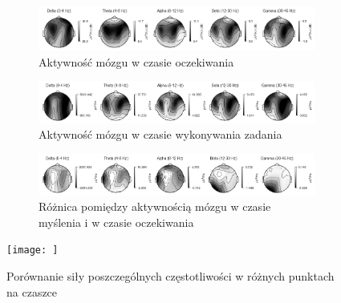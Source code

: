 \documentclass{./assets/wfis}
\begin{document}
\begin{figure}[h!]
    \centering
    \begin{subfigure}[b]{\textwidth}
    \centering
    \includegraphics[width=\columnwidth]{thesis/assets/waiting.png}
    \caption{Aktywność mózgu w czasie oczekiwania}
    \label{fig:waiting}
\end{subfigure}


\begin{subfigure}[b]{\textwidth}
    \centering
    \includegraphics[width=\columnwidth]{thesis/assets/thinking.png}
    \caption{Aktywność mózgu w czasie wykonywania zadania}
    \label{fig:thinking}
\end{subfigure}


\begin{subfigure}[b]{\textwidth}
    \centering
    \includegraphics[width=\columnwidth]{thesis/assets/diff.png}
    \caption{Różnica pomiędzy aktywnością mózgu w czasie myślenia i w czasie oczekiwania}
    \label{fig:diff}
\end{subfigure}
    \texttt{[image: ]}
    \caption{Porównanie siły poszczególnych częstotliwości w różnych punktach na czaszce}
    \label{fig:brain-heatmaps}
\end{figure}
\end{document}
